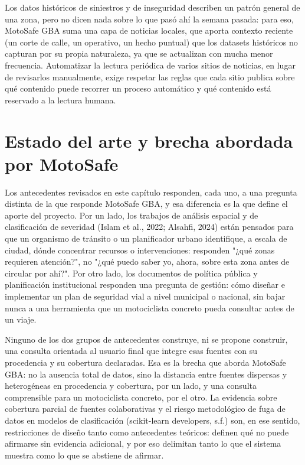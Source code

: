 Los datos históricos de siniestros y de inseguridad describen un patrón
general de una zona, pero no dicen nada sobre lo que pasó ahí la semana
pasada: para eso, MotoSafe GBA suma una capa de noticias locales, que
aporta contexto reciente (un corte de calle, un operativo, un hecho
puntual) que los datasets históricos no capturan por su propia
naturaleza, ya que se actualizan con mucha menor frecuencia. Automatizar
la lectura periódica de varios sitios de noticias, en lugar de
revisarlos manualmente, exige respetar las reglas que cada sitio publica
sobre qué contenido puede recorrer un proceso automático y qué contenido
está reservado a la lectura humana.

\section{Estado del arte y brecha abordada por MotoSafe}

Los antecedentes revisados en este capítulo responden, cada uno, a una
pregunta distinta de la que responde MotoSafe GBA, y esa diferencia es
la que define el aporte del proyecto. Por un lado, los trabajos de
análisis espacial y de clasificación de severidad (Islam et al., 2022;
Alsahfi, 2024) están pensados para que un organismo de tránsito o un
planificador urbano identifique, a escala de ciudad, dónde concentrar
recursos o intervenciones: responden "¿qué zonas requieren atención?",
no "¿qué puedo saber yo, ahora, sobre esta zona antes de circular por
ahí?". Por otro lado, los documentos de política pública y planificación
institucional \citep{caf2013,camacho2025} responden una pregunta de
gestión: cómo diseñar e implementar un plan de seguridad vial a nivel
municipal o nacional, sin bajar nunca a una herramienta que un
motociclista concreto pueda consultar antes de un viaje.

Ninguno de los dos grupos de antecedentes construye, ni se propone
construir, una consulta orientada al usuario final que integre esas
fuentes con su procedencia y su cobertura declaradas. Esa es la brecha
que aborda MotoSafe GBA: no la ausencia total de datos, sino la
distancia entre fuentes dispersas y heterogéneas en procedencia y
cobertura, por un lado, y una consulta comprensible para un motociclista
concreto, por el otro. La evidencia sobre cobertura parcial de fuentes
colaborativas \citep{aminnaseri2018} y el riesgo metodológico de
fuga de datos en modelos de clasificación (scikit-learn developers,
s.f.) son, en ese sentido, restricciones de diseño tanto como
antecedentes teóricos: definen qué no puede afirmarse sin evidencia
adicional, y por eso delimitan tanto lo que el sistema muestra como lo
que se abstiene de afirmar.
